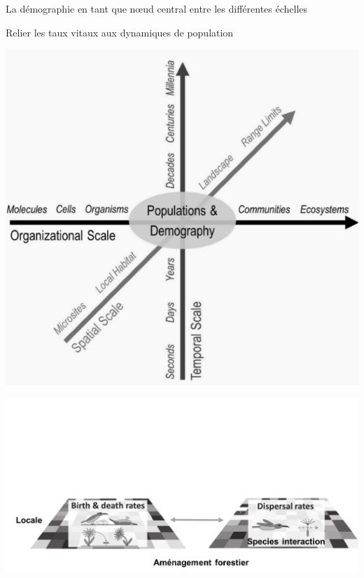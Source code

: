 \documentclass[11pt, compress, aspectratio=1610]{beamer}
\begin{document}
\begin{frame}{La démographie en tant que nœud central entre les
différentes échelles}
\protect\hypertarget{la-duxe9mographie-en-tant-que-nux153ud-central-entre-les-diffuxe9rentes-uxe9chelles}{}

\vspace*{-5mm}

Relier les taux vitaux aux dynamiques de population

\centering

\includegraphics[scale=0.65]{figures/Griffith2016.png}

\par

\includegraphics[scale=0.47]{figures/scaleInt.png}

\par


\end{frame}
\end{document}
